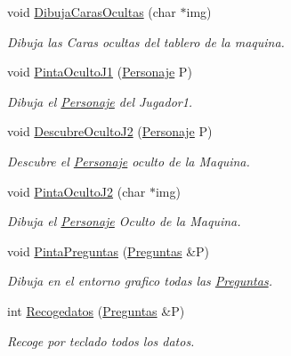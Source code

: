\begin{CompactItemize}
void \hyperlink{class_config_9f697dc06ed8ea10eb674ffa747bbdab}{DibujaCarasOcultas} (char $\ast$img)
\begin{CompactList}\small\item\em Dibuja las Caras ocultas del tablero de la maquina. \item\end{CompactList}\item 
void \hyperlink{class_config_a65b0dec7dbb915a147f0e1a48177cfc}{PintaOcultoJ1} (\hyperlink{class_personaje}{Personaje} P)
\begin{CompactList}\small\item\em Dibuja el \hyperlink{class_personaje}{Personaje} del Jugador1. \item\end{CompactList}\item 
void \hyperlink{class_config_bef122e837338a9bcc4c2b0a95866d31}{DescubreOcultoJ2} (\hyperlink{class_personaje}{Personaje} P)
\begin{CompactList}\small\item\em Descubre el \hyperlink{class_personaje}{Personaje} oculto de la Maquina. \item\end{CompactList}\item 
void \hyperlink{class_config_1d4493399b5138963924586b02daf6ad}{PintaOcultoJ2} (char $\ast$img)
\begin{CompactList}\small\item\em Dibuja el \hyperlink{class_personaje}{Personaje} Oculto de la Maquina. \item\end{CompactList}\item 
void \hyperlink{class_config_69dbcf835071f978ec360958ee54860e}{PintaPreguntas} (\hyperlink{class_preguntas}{Preguntas} \&P)
\begin{CompactList}\small\item\em Dibuja en el entorno grafico todas las \hyperlink{class_preguntas}{Preguntas}. \item\end{CompactList}\item 
int \hyperlink{class_config_6098dc6aed67f0e0df613d56cceeddc7}{Recogedatos} (\hyperlink{class_preguntas}{Preguntas} \&P)
\begin{CompactList}\small\item\em Recoge por teclado todos los datos. \item\end{CompactList}\item 

\end{CompactItemize}
